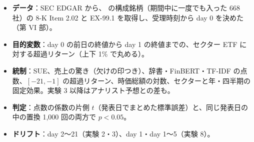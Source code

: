 \begin{projbox}
\begin{itemize}
\item \textbf{データ}：SEC EDGAR から、\SP{} の構成銘柄（期間中に一度でも入った 668 社）の 8-K Item 2.02 と EX-99.1 を取得し、受理時刻から day 0 を決めた（第 VI 部）。
\item \textbf{目的変数}：day 0 の前日の終値から day 1 の終値までの、セクター ETF に対する超過リターン（上下 1\% で丸める）。
\item \textbf{統制}：SUE、売上の驚き（欠けの印つき）、辞書・FinBERT・TF-IDF の点数、$[-21,-1]$ の超過リターン、時価総額の対数、セクターと年・四半期の固定効果。実験 3 以降はアナリスト予想との差も。
\item \textbf{判定}：点数の係数の片側 $t$（発表日でまとめた標準誤差）と、同じ発表日の中の置換 1,000 回の両方で $p<0.05$。
\item \textbf{ドリフト}：day 2〜21（実験 2・3）、day 1・day 1〜5（実験 8）。
\end{itemize}
\end{projbox}
